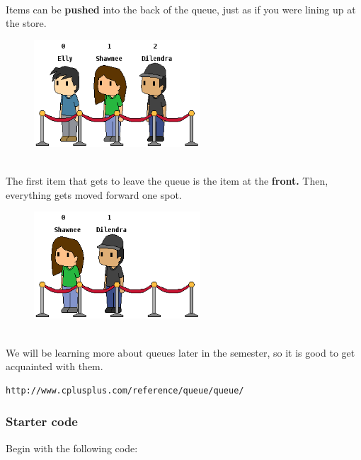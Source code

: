\documentclass[a4paper,12pt]{book}
\begin{document}
                \newpage
                ~\\ Items can be \textbf{ pushed } into the back of the queue,
                just as if you were lining up at the store. ~\\

                \begin{figure}[h]
                    \centering
                    \includegraphics[height=4cm]{lab01-queue-b}
                \end{figure}

                ~\\ The first item that gets to leave the queue is the item at the \textbf{ front. }
                Then, everything gets moved forward one spot.
                ~\\

                \begin{figure}[h]
                    \centering
                    \includegraphics[height=4cm]{lab01-queue-c}
                \end{figure}

                ~\\ We will be learning more about queues later
                in the semester, so it is good to get acquainted with them.

\begin{verbatim}
http://www.cplusplus.com/reference/queue/queue/
\end{verbatim}
                
                \hrulefill{}
                \subsubsection*{ Starter code }
                    Begin with the following code:
\end{document}
